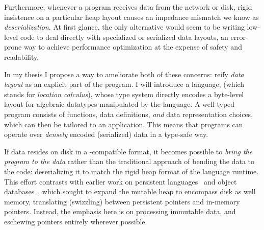 \documentclass[showabstract,showacknowledgments,showpreface,showdedication]{iuphd}
\theoremstyle{nonumberplain}
\begin{document}
Furthermore, whenever a program receives data from the network or
disk, rigid insistence on a particular heap layout causes an impedance mismatch
we know as {\em deserialization}.
%
%
At first glance, the only alternative would seem to be writing low-level code to
deal directly with specialized or serialized data layouts, an error-prone way to
achieve performance optimization at the expense of safety and readability.

In my thesis I propose a way to ameliorate both of these concerns: reify {\em
data layout} as an explicit part of the program. I will introduce a language,
\ourcalc (which stands for {\em location calculus}), whose type system directly
encodes a byte-level layout for algebraic datatypes manipulated by the language.
%
A well-typed program consists of functions, data definitions, {\em and} 
data representation choices, which
can then be tailored to an application.
%
This means that programs can operate over {\em densely}
encoded (serialized) data in a type-safe way.
%

{If data resides on disk in a \ourcalc-compatible format}, it becomes
possible to {\em bring the program to the data} rather than the traditional
approach of bending the data to the code: deserializing it to match the rigid
heap format of the language runtime.
{This effort contrasts with earlier work on persistent
languages~\cite{persistent-java,persistent-objects-thor} and object databases~\cite{object-fault-handling},
which sought to expand the mutable heap to encompass disk as well memory,
translating (swizzling) between persistent pointers and in-memory pointers.  Instead, the
emphasis here is on processing immutable data, and eschewing pointers entirely
wherever possible.}

\end{document}
